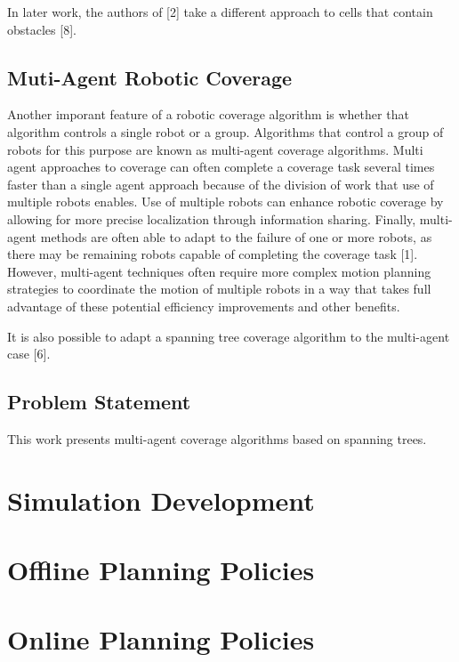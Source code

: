 \documentclass[letterpaper, 12pt, leqno]{report}
\begin{document}
In later work, the authors of [2] take a different approach to cells that contain obstacles [8]. 

\section{Muti-Agent Robotic Coverage}

Another imporant feature of a robotic coverage algorithm is whether that algorithm controls a single robot or a group. Algorithms that control a group of robots for this purpose are known as multi-agent coverage algorithms. Multi agent approaches to coverage can often complete a coverage task several times faster than a single agent approach because of the division of work that use of multiple robots enables. Use of multiple robots can enhance robotic coverage by allowing for more precise localization through information sharing. Finally, multi-agent methods are often able to adapt to the failure of one or more robots, as there may be remaining robots capable of completing the coverage task [1]. However, multi-agent techniques often require more complex motion planning strategies to coordinate the motion of multiple robots in a way that takes full advantage of these potential efficiency improvements and other benefits.

It is also possible to adapt a spanning tree coverage algorithm to the multi-agent case [6].

\section{Problem Statement}

This work presents multi-agent coverage algorithms based on spanning trees.


\chapter{Simulation Development}

\chapter{Offline Planning Policies}

\chapter{Online Planning Policies}
\end{document}
